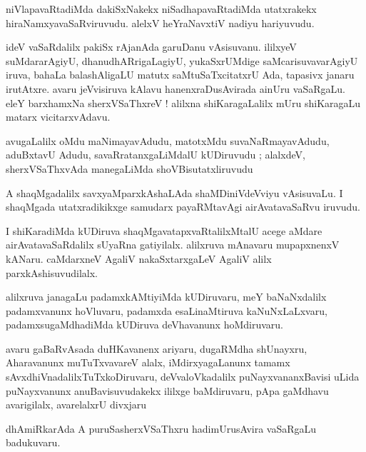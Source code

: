 \documentclass{article}
\begin{document}
\begin{mn}
niVlapavaRtadiMda dakiSxNakekx niSadhapavaRtadiMda utatxrakekx hiraNamxyavaSaRviruvudu. 
alelxV heYraNavxtiV nadiyu hariyuvudu.
\end{mn}

\begin{mn}
ideV vaSaRdalilx pakiSx rAjanAda garuDanu vAsisuvanu. 
ililxyeV suMdararAgiyU, dhanudhARrigaLagiyU, yukaSxrUMdige saMcarisuvavarAgiyU iruva, 
bahaLa balashAligaLU matutx saMtuSaTxcitatxrU Ada, tapasivx janaru irutAtxre.
avaru jeVvisiruva kAlavu hanenxraDusAvirada ainUru vaSaRgaLu. eleY barxhamxNa sherxVSaThxreV !
alilxna shiKaragaLalilx mUru shiKaragaLu matarx vicitarxvAdavu.
\end{mn}

\begin{mn}
avugaLalilx oMdu maNimayavAdudu, matotxMdu suvaNaRmayavAdudu, aduBxtavU Adudu, 
savaRratanxgaLiMdalU kUDiruvudu ; alalxdeV, sherxVSaThxvAda manegaLiMda shoVBisutatxliruvudu
\end{mn}

\begin{mn}
A shaqMgadalilx savxyaMparxkAshaLAda shaMDiniVdeVviyu vAsisuvaLu. 
I shaqMgada utatxradikikxge samudarx payaRMtavAgi airAvatavaSaRvu iruvudu.
\end{mn}

\begin{mn}
I shiKaradiMda kUDiruva shaqMgavatapxvaRtalilxMtalU acege aMdare 
airAvatavaSaRdalilx sUyaRna gatiyilalx. alilxruva mAnavaru mupapxnenxV kANaru. 
caMdarxneV AgaliV nakaSxtarxgaLeV AgaliV alilx parxkAshisuvudilalx.
\end{mn}

\begin{mn}
alilxruva janagaLu padamxkAMtiyiMda kUDiruvaru, meY baNaNxdalilx padamxvanunx hoVluvaru, 
padamxda esaLinaMtiruva kaNuNxLaLxvaru, padamxsugaMdhadiMda  kUDiruva deVhavanunx hoMdiruvaru.
\end{mn}

\begin{mn}
avaru gaBaRvAsada duHKavanenx ariyaru, dugaRMdha shUnayxru, Aharavanunx muTuTxvavareV alalx,
iMdirxyagaLanunx tamamx sAvxdhiVnadalilxTuTxkoDiruvaru, deVvaloVkadalilx puNayxvananxBavisi
uLida puNayxvanunx anuBavisuvudakekx ililxge baMdiruvaru, pApa gaMdhavu avarigilalx,
avarelalxrU divxjaru
\end{mn}

\begin{mn}
dhAmiRkarAda A puruSasherxVSaThxru hadimUrusAvira vaSaRgaLu badukuvaru.
\end{mn}
\end{document}
